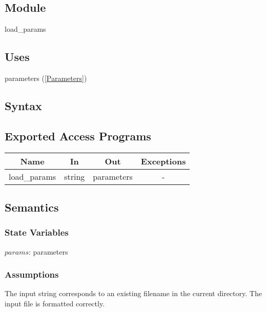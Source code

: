 \documentclass[12pt]{article}
\begin{document}
\subsection{Module}
load\_params
\subsection{Uses}
parameters (\ref{Parameters})
\subsection{Syntax}
\subsection{Exported Access Programs}
\begin{center}
\begin{tabular}{c c c c}
\hline
\textbf{Name} & \textbf{In} & \textbf{Out} & \textbf{Exceptions} \\
\hline
load\_params & string & parameters &  - \\
\hline
\end{tabular}
\end{center}
\subsection{Semantics}
\subsubsection{State Variables}
$params$: parameters
\subsubsection{Assumptions}
The input string corresponds to an existing filename in the current directory. The input file is formatted correctly.
\end{document}
